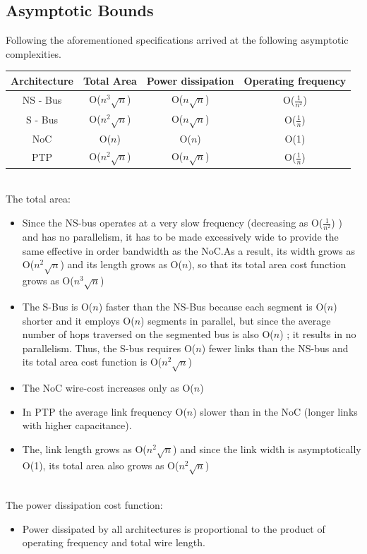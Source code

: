 \subsection{Asymptotic Bounds}

Following the aforementioned specifications \cite{Bolotin:2004:CCN:1056481.1056484}
arrived at the following asymptotic complexities.

\begin{tabular}{|c|c|c|c|}
\hline 
Architecture & Total Area & Power dissipation & Operating frequency\tabularnewline
\hline 
\hline 
NS - Bus & O($n^{3}\sqrt{n}$) & O($n\sqrt{n}$) & O($\tfrac{1}{n^{2}}$)\tabularnewline
\hline 
S - Bus & O($n^{2}\sqrt{n}$) & O($n\sqrt{n}$) & O($\tfrac{1}{n}$)\tabularnewline
\hline 
NoC & O($n$) & O($n$) & O(1)\tabularnewline
\hline 
PTP & O($n^{2}\sqrt{n}$) & O($n\sqrt{n}$) & O($\tfrac{1}{n}$)\tabularnewline
\hline 
\end{tabular}

\ \\

The total area: 
\begin{itemize}
\item Since the NS-bus operates at a very slow frequency (decreasing as
O($\tfrac{1}{n^{2}}$) ) and has no parallelism, it has to be made
excessively wide to provide the same effective in order bandwidth
as the NoC.As a result, its width grows as O($n^{2}\sqrt{n}$) and
its length grows as O($n$), so that its total area cost function
grows as O($n^{3}\sqrt{n}$)
\item The S-Bus is O($n$) faster than the NS-Bus because each segment is
O($n$) shorter and it employs O($n$) segments in parallel, but since
the average number of hops traversed on the segmented bus is also
O($n$) ; it results in no parallelism. Thus, the S-bus requires O($n$)
fewer links than the NS-bus and its total area cost function is O($n^{2}\sqrt{n}$)
\item The NoC wire-cost increases only as O($n$)
\item In PTP the average link frequency O($n$) slower than in the NoC (longer
links with higher capacitance).
\item The, link length grows as O($n^{2}\sqrt{n}$) and since the link width
is asymptotically O(1), its total area also grows as O($n^{2}\sqrt{n}$)
\end{itemize}
\ \\

The power dissipation cost function:
\begin{itemize}
\item Power dissipated by all architectures is proportional to the product
of operating frequency and total wire length. 
\end{itemize}
\ \\

